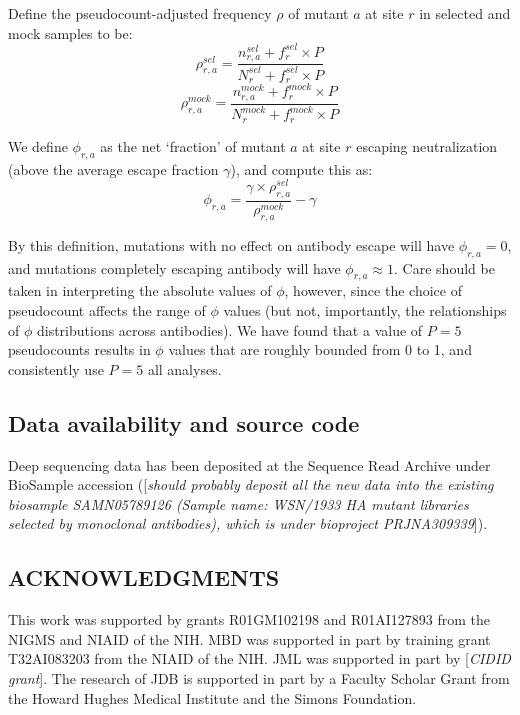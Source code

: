 \documentclass[11pt]{article}
\newcommand{\comment}[1]{{\color{red}[\textsl{#1}]}}
\begin{document}
Define the pseudocount-adjusted frequency $\rho$ of mutant $a$ at site $r$ in selected and mock samples to be:
$$\rho_{r,a}^{sel} = \frac{n_{r,a}^{sel}+f_r^{sel}\times P}{N_r^{sel}+f_r^{sel}\times  P}$$
$$\rho_{r,a}^{mock} = \frac{n_{r,a}^{mock}+f_r^{mock}\times P}{N_r^{mock}+f_r^{mock}\times  P}$$

We define $\phi_{r,a}$ as the net `fraction' of mutant $a$ at site $r$ escaping neutralization (above the average escape fraction $\gamma$), and compute this as:
$$\phi_{r,a} = \frac{\gamma \times \rho_{r,a}^{sel}}{\rho_{r,a}^{mock}} - \gamma$$

By this definition, mutations with no effect on antibody escape will have $\phi_{r,a} =0$, and mutations completely escaping antibody will have $\phi_{r,a} \approx 1$.
Care should be taken in interpreting the absolute values of $\phi$, however, since the choice of pseudocount affects the range of $\phi$ values (but not, importantly, the relationships of $\phi$ distributions across antibodies).
We have found that a value of $P=5$ pseudocounts results in $\phi$ values that are roughly bounded from 0 to 1, and consistently use $P=5$ all analyses.

\subsection*{Data availability and source code}
Deep sequencing data has been deposited at the Sequence Read Archive under BioSample accession (\comment{should probably deposit all the new data into the existing biosample SAMN05789126 (Sample name: WSN/1933 HA mutant libraries selected by monoclonal antibodies), which is under bioproject PRJNA309339}).




\clearpage

\small
\subsection*{ACKNOWLEDGMENTS}
This work was supported by grants R01GM102198 and R01AI127893 from the NIGMS and NIAID of the NIH.
MBD was supported in part by training grant T32AI083203 from the NIAID of the NIH.
JML was supported in part by \comment{CIDID grant}.
The research of JDB is supported in part by a Faculty Scholar Grant from the Howard Hughes Medical Institute and the Simons Foundation.




\clearpage
\normalsize
\end{document}
